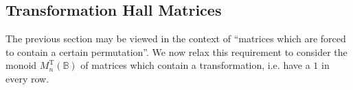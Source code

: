 \documentclass[11pt]{article}
\numberwithin{equation}{section}
\newcommand{\B}{\mathbb{B}}
\newcommand{\Halln}{M_n^{\text{S}}(\B)}
\newcommand{\Hall}[1]{M_{#1}^{\text{S}}(\B)}
\newcommand{\MTn}{M_n^{\text{T}}(\B)}
\newcommand{\J}{\mathscr{J}}
\begin{document}
%  
%
%  
%  
% 
%
%

\subsection{Transformation Hall Matrices}
The previous section may be viewed in the context of ``matrices which are forced
to contain a certain permutation''. We now relax this requirement to consider
the monoid $\MTn$ of matrices which contain a transformation, i.e. have a $1$ in
every row.
\end{document}
